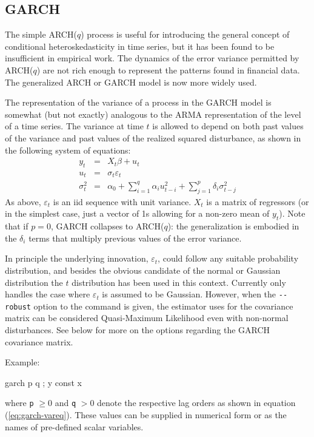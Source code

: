 \subsection{GARCH}
\label{subsec:garch}

The simple ARCH($q$) process is useful for introducing the general
concept of conditional heteroskedasticity in time series, but it has
been found to be insufficient in empirical work.  The dynamics of the
error variance permitted by ARCH($q$) are not rich enough to represent 
the patterns found in financial data.  The generalized ARCH or GARCH
model is now more widely used.  

The representation of the variance of a process in the GARCH model is
somewhat (but not exactly) analogous to the ARMA representation of the
level of a time series.  The variance at time $t$ is allowed
to depend on both past values of the variance and past values of the
realized squared disturbance, as shown in the following system
of equations:
\begin{eqnarray}
  \label{eq:garch-meaneq}
  y_t &  = & X_t \beta + u_t \\
  \label{eq:garch-epseq}
  u_t &  = & \sigma_t \varepsilon_t \\
  \label{eq:garch-vareq}
  \sigma^2_t & = & \alpha_0 + \sum_{i=1}^q \alpha_i u^2_{t-i} +
	  \sum_{j=1}^p \delta_i \sigma^2_{t-j}
\end{eqnarray}
As above, $\varepsilon_t$ is an iid sequence with unit variance.
$X_t$ is a matrix of regressors (or in the simplest case,
just a vector of 1s allowing for a non-zero mean of $y_t$).  Note that
if $p=0$, GARCH collapses to ARCH($q$): the generalization is embodied
in the $\delta_i$ terms that multiply previous values of the error
variance.

In principle the underlying innovation, $\varepsilon_t$, could follow
any suitable probability distribution, and besides the obvious
candidate of the normal or Gaussian distribution the $t$ distribution
has been used in this context.  Currently  only handles the
case where $\varepsilon_t$ is assumed to be Gaussian.  However, when
the \verb|--robust| option to the  command is given, the
estimator  uses for the covariance matrix can be considered
Quasi-Maximum Likelihood even with non-normal disturbances.  See below
for more on the options regarding the GARCH covariance matrix.

Example:
\begin{code}
  garch p q ; y const x
\end{code}
where \verb|p| $\ge 0$ and \verb|q| $>0$ denote the respective lag
orders as shown in equation (\ref{eq:garch-vareq}).  These values
can be supplied in numerical form or as the names of pre-defined
scalar variables.

